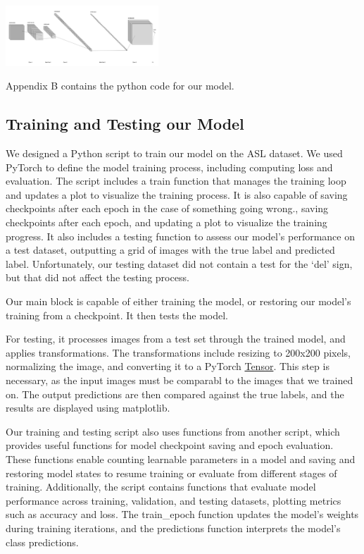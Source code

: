 \documentclass[10pt,twocolumn,letterpaper]{article}
\begin{document}
\includegraphics[width=0.43\textwidth]{../writeup_imgs/model.jpeg}

Appendix B contains the python code for our model.

\subsection{Training and Testing our Model}

We designed a Python script to train our model on the ASL dataset. We 
used PyTorch to define the model training process, including computing 
loss and evaluation. The script includes a train function that manages
the training loop and updates a plot to visualize the training process.
It is also capable of saving checkpoints after each epoch in the case
of something going wrong., saving checkpoints after each epoch, and 
updating a plot to visualize the training progress. It also includes
a testing function to assess our model's performance on a test dataset,
outputting a grid of images with the true label and predicted label.
Unfortunately, our testing dataset did not contain a test for the 
‘del’ sign, but that did not affect the testing process. 

Our main block is capable of either training the model, or restoring
our model’s training from a checkpoint. It then tests the model.

For testing, it processes images from a test set through the trained model,
and applies transformations. The transformations include resizing to
200x200 pixels, normalizing the image, and converting it to a PyTorch
\href{https://pytorch.org/docs/stable/tensors.html}{Tensor}.
This step is necessary, as the input images must be comparabl
to the images that we trained on. The output predictions are
then compared against the true labels, and the results are displayed using matplotlib. 

Our training and testing script also uses functions from another script, 
which provides useful functions for model checkpoint saving and epoch 
evaluation. These functions enable counting learnable parameters in 
a model and saving and restoring model states to resume training or 
evaluate from different stages of training. Additionally, the script 
contains functions that evaluate model performance across training, 
validation, and testing datasets, plotting metrics such as accuracy 
and loss. The train\_epoch function updates the model's weights during
training iterations, and the predictions function interprets the model’s class predictions.
\end{document}

